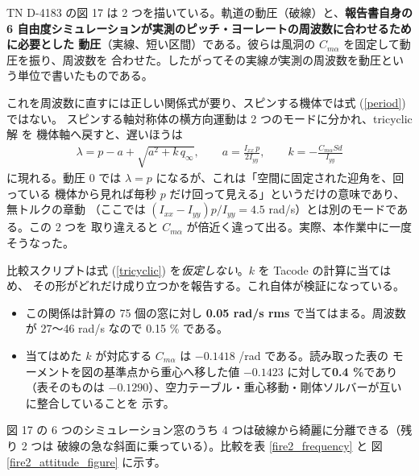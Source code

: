 \documentclass[11pt,a4paper,dvipdfmx]{jsarticle}
\begin{document}
TN D-4183 の図 17 は 2 つを描いている。軌道の動圧（破線）と、\textbf{報告書自身の
6 自由度シミュレーションが実測のピッチ・ヨーレートの周波数に合わせるために必要とした
動圧}（実線、短い区間）である。彼らは風洞の $C_{m\alpha}$ を固定して動圧を振り、周波数を
合わせた。したがってその実線\emph{が}実測の周波数を動圧という単位で書いたものである。

これを周波数に直すには正しい関係式が要り、スピンする機体では式 (\ref{period}) ではない。
スピンする軸対称体の横方向運動は 2 つのモードに分かれ、tricyclic 解 \cite{Murphy1963} を
機体軸へ戻すと、遅いほうは
%
\begin{align}
	\lambda = p - a + \sqrt{a^2 + k \, q_{\infty}} ,
	\qquad
	a = \frac{I_{xx} \, p}{2 I_{yy}} ,
	\qquad
	k = - \frac{ C_{m\alpha} S d }{ I_{yy} }
	\label{tricyclic}
\end{align}
%
に現れる。動圧 0 では $\lambda = p$ になるが、これは「空間に固定された迎角を、回っている
機体から見れば毎秒 $p$ だけ回って見える」というだけの意味であり、無トルクの章動
（ここでは $(I_{xx} - I_{yy}) p / I_{yy} = 4.5$ rad/s）とは別のモードである。この 2 つを
取り違えると $C_{m\alpha}$ が倍近く違って出る。実際、本作業中に一度そうなった。

比較スクリプトは式 (\ref{tricyclic}) を\emph{仮定しない}。$k$ を Tacode の計算に当てはめ、
その形がどれだけ成り立つかを報告する。これ自体が検証になっている。

\begin{itemize}
\item この関係は計算の 75 個の窓に対し \textbf{0.05 rad/s rms} で当てはまる。周波数が
27〜46 rad/s なので 0.15 \% である。
\item 当てはめた $k$ が対応する $C_{m\alpha}$ は $-0.1418$ /rad である。読み取った表の
モーメントを図の基準点から重心へ移した値 $-0.1423$ に対して\textbf{0.4 \%}であり
（表そのものは $-0.1290$）、空力テーブル・重心移動・剛体ソルバーが互いに整合していることを
示す。
\end{itemize}

図 17 の 6 つのシミュレーション窓のうち 4 つは破線から綺麗に分離できる（残り 2 つは
破線の急な斜面に乗っている）。比較を表 \ref{fire2_frequency} と
図 \ref{fire2_attitude_figure} に示す。
\end{document}
